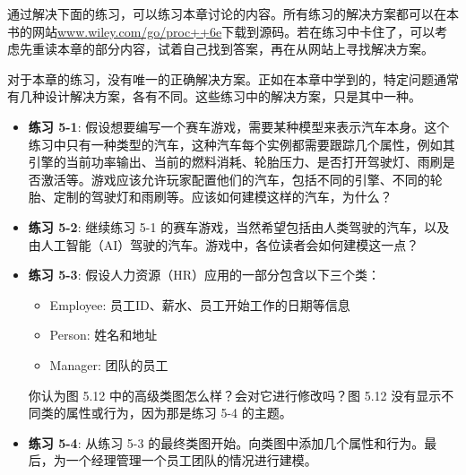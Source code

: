 通过解决下面的练习，可以练习本章讨论的内容。所有练习的解决方案都可以在本书的网站\url{www.wiley.com/go/proc++6e}下载到源码。若在练习中卡住了，可以考虑先重读本章的部分内容，试着自己找到答案，再在从网站上寻找解决方案。

对于本章的练习，没有唯一的正确解决方案。正如在本章中学到的，特定问题通常有几种设计解决方案，各有不同。这些练习中的解决方案，只是其中一种。

\begin{itemize}
\item
\textbf{练习 5-1}: 假设想要编写一个赛车游戏，需要某种模型来表示汽车本身。这个练习中只有一种类型的汽车，这种汽车每个实例都需要跟踪几个属性，例如其引擎的当前功率输出、当前的燃料消耗、轮胎压力、是否打开驾驶灯、雨刷是否激活等。游戏应该允许玩家配置他们的汽车，包括不同的引擎、不同的轮胎、定制的驾驶灯和雨刷等。应该如何建模这样的汽车，为什么？

\item
\textbf{练习 5-2}: 继续练习 5-1 的赛车游戏，当然希望包括由人类驾驶的汽车，以及由人工智能（AI）驾驶的汽车。游戏中，各位读者会如何建模这一点？

\item
\textbf{练习 5-3}: 假设人力资源（HR）应用的一部分包含以下三个类：

\begin{itemize}
\item
Employee: 员工ID、薪水、员工开始工作的日期等信息

\item
Person: 姓名和地址

\item
Manager: 团队的员工
\end{itemize}

你认为图 5.12 中的高级类图怎么样？会对它进行修改吗？图 5.12 没有显示不同类的属性或行为，因为那是练习 5-4 的主题。


\item
\textbf{练习 5-4}: 从练习 5-3 的最终类图开始。向类图中添加几个属性和行为。最后，为一个经理管理一个员工团队的情况进行建模。
\end{itemize}







